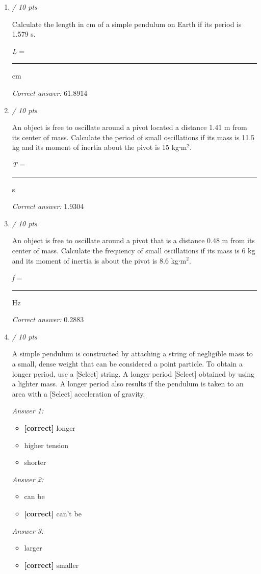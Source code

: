 \documentclass[11pt]{article}
\begin{document}
\begin{enumerate}[leftmargin=*,label=\textbf{Question \arabic*.}]
\textit{Correct answer: } 1.2323

\item \hfill \textit{/ 10 pts}

Calculate the length in cm of a simple pendulum on Earth if its period is 1.579 s.



\emph{L} = \rule{2cm}{0.4pt} cm

\textit{Correct answer: } 61.8914

\item \hfill \textit{/ 10 pts}

An object is free to oscillate around a pivot located a distance 1.41 m from its center of mass. Calculate the period of small oscillations if its mass is 11.5 kg and its moment of inertia about the pivot is 15 kgᐧm$^{2}$.



\emph{T} = \rule{2cm}{0.4pt} s

\textit{Correct answer: } 1.9304

\item \hfill \textit{/ 10 pts}

An object is free to oscillate around a pivot that is a distance 0.48 m from its center of mass. Calculate the frequency of small oscillations if its mass is 6 kg and its moment of inertia is about the pivot is 8.6 kgᐧm$^{2}$.



\emph{f} = \rule{2cm}{0.4pt} Hz

\textit{Correct answer: } 0.2883

\item \hfill \textit{/ 10 pts}

A simple pendulum is constructed by attaching a string of negligible mass to a small, dense weight that can be considered a point particle. To obtain a longer period, use a [Select]
 string. A longer period [Select]
 obtained by using a lighter mass. A longer period also results if the pendulum is taken to an area with a [Select]
 acceleration of gravity.

\textit{Answer 1:}
\begin{itemize}
  \item \textbf{[correct]} longer
  \item higher tension
  \item shorter
\end{itemize}
\textit{Answer 2:}
\begin{itemize}
  \item can be
  \item \textbf{[correct]} can't be
\end{itemize}
\textit{Answer 3:}
\begin{itemize}
  \item larger
  \item \textbf{[correct]} smaller
\end{itemize}

\end{enumerate}
\end{document}
